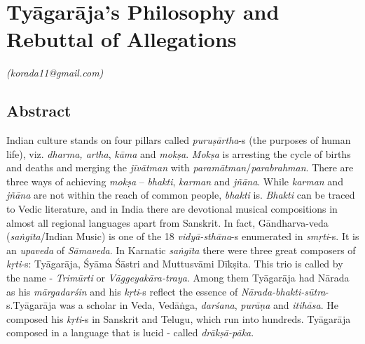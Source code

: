 
\chapter{Tyāgarāja’s Philosophy and Rebuttal of Allegations}\label{chapter3}


\vspace{-.3cm}

\begin{flushright}
\textit{(korada11@gmail.com)}
\end{flushright}


\section*{Abstract}

Indian culture stands on four pillars called \textit{puruṣārtha}-s (the purposes of human life), viz. \textit{dharma, artha}, \textit{kāma} and \textit{mokṣa}. \textit{Mokṣa} is arresting the cycle of births and deaths and merging the \textit{jīvātman} with \textit{paramātman}/\textit{parabrahman}. There are three ways of achieving \textit{mokṣa} – \textit{bhakti}, \textit{karman} and \textit{jñāna}. While \textit{karman} and \textit{jñāna} are not within the reach of common people, \textit{bhakti} is. \textit{Bhakti} can be traced to Vedic literature, and in India there are devotional musical compositions in almost all regional languages apart from Sanskrit. In fact, Gāndharva-veda (\textit{saṅgīta}/Indian Music) is one of the 18 \textit{vidyā-sthāna}-s enumerated in \textit{smṛti}-s. It is an \textit{upaveda} of \textit{Sāmaveda}. In Karnatic \textit{saṅgīta} there were three great composers of \textit{kṛti}-s: Tyāgarāja, Śyāma Śāstri and Muttusvāmi Dīkṣita. This trio is called by the name - \textit{Trimūrti} or \textit{Vāggeyakāra-traya}. Among them Tyāgarāja had Nārada as his \textit{mārgadarśin} and his \textit{kṛti}-s reflect the essence of \textit{Nārada-bhakti-sūtra}-s.\break Tyāgarāja was a scholar in Veda, Vedāṅga, \textit{darśana}, \textit{purāṇa} and \textit{itihāsa}. He composed his \textit{kṛti}-s in Sanskrit and Telugu, which run into hundreds. Tyāgarāja composed in a language that is lucid - called \textit{drākṣā-pāka}. 

